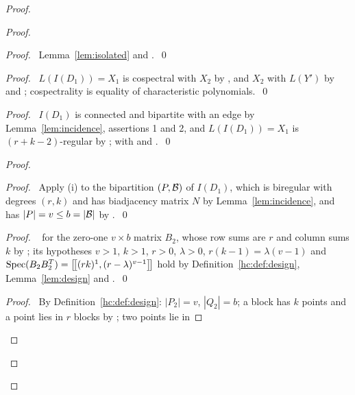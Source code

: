 \begin{proof}
 \begin{proof}
  \begin{proof}\pf\ Lemma~\ref{lem:isolated} and .~\qed\end{proof}
  \begin{proof}\pf\ $L(I(D_1))=X_1$ is cospectral with $X_2$ by , and $X_2$ with
   $L(Y')$ by  and ; cospectrality is equality of
   characteristic polynomials.~\qed\end{proof}
  \begin{proof}\pf\ $I(D_1)$ is connected and bipartite with an edge by
   Lemma~\ref{lem:incidence}, assertions 1 and 2, and $L(I(D_1))=X_1$ is $(r+k-2)$-regular by
   ; with  and .~\qed\end{proof}
  \begin{proof}
   \begin{proof}\pf\ Apply (i) to the bipartition $(P,{\mathcal B})$ of $I(D_1)$, which is biregular with
    degrees $(r,k)$ and has biadjacency matrix $N$ by Lemma~\ref{lem:incidence}, and has
    $|P|=v\le b=|{\mathcal B}|$ by .~\qed\end{proof}
   \begin{proof}\pf\  for the zero-one $v\times b$ matrix $B_2$, whose row sums
    are $r$ and column sums $k$ by ; its hypotheses $v>1$, $k>1$, $r>0$,
    $\lambda>0$, $r(k-1)=\lambda(v-1)$ and $\mathop{\mathrm{Spec}}\nolimits(B_2B_2^T)=\left[\!\left[(rk)^{1},(r-\lambda)^{v-1}\right]\!\right]$ hold
    by Definition~\ref{hc:def:design}, Lemma~\ref{lem:design} and
    .~\qed\end{proof}
   \begin{proof}\pf\ By Definition~\ref{hc:def:design}: $|P_2|=v$, $|Q_2|=b$; a block has $k$
    points and a point lies in $r$ blocks by ; two points lie in

\end{proof}
\end{proof}
\end{proof}
\end{proof}
